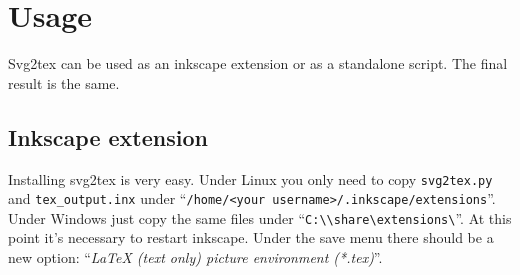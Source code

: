 \documentclass[a4paper,12pt]{article}
\begin{document}
\section{Usage}

Svg2tex can be used as an inkscape extension or as a standalone script. The final result is the same.

\subsection{Inkscape extension}

Installing svg2tex is very easy. Under Linux you only need to copy \texttt{svg2tex.py} and \texttt{tex\_output.inx} under ``\texttt{/home/<your username>/.inkscape/extensions}''. Under Windows just copy the same files under ``\texttt{C:\textbackslash<inkscape installation directory>\textbackslash share\textbackslash extensions\textbackslash}''. At this point it's necessary to restart inkscape. Under the save menu there should be a new option: ``\emph{LaTeX (text only) picture environment (*.tex)}''.
\end{document}
